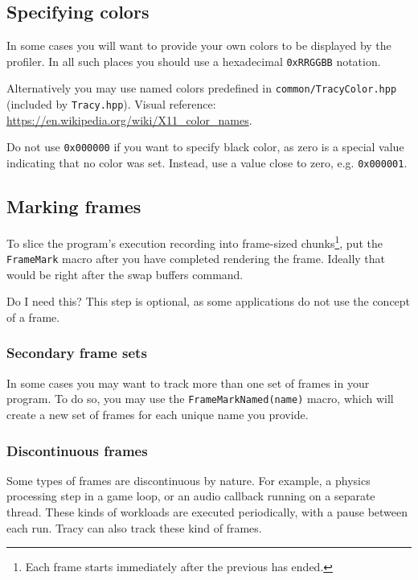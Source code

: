 \documentclass[hidelinks,titlepage,a4paper]{article}
\begin{document}
\subsection{Specifying colors}

In some cases you will want to provide your own colors to be displayed by the profiler. In all such places you should use a hexadecimal \texttt{0xRRGGBB} notation.

Alternatively you may use named colors predefined in \texttt{common/TracyColor.hpp} (included by \texttt{Tracy.hpp}). Visual reference: \url{https://en.wikipedia.org/wiki/X11_color_names}.

Do not use \texttt{0x000000} if you want to specify black color, as zero is a special value indicating that no color was set. Instead, use a value close to zero, e.g. \texttt{0x000001}.

\subsection{Marking frames}
\label{markingframes}

To slice the program's execution recording into frame-sized chunks\footnote{Each frame starts immediately after the previous has ended.}, put the \texttt{FrameMark} macro after you have completed rendering the frame. Ideally that would be right after the swap buffers command.

\begin{bclogo}[
noborder=true,
couleur=black!5,
logo=\bclampe
]{Do I need this?}
This step is optional, as some applications do not use the concept of a frame.
\end{bclogo}

\subsubsection{Secondary frame sets}
\label{secondaryframeset}

In some cases you may want to track more than one set of frames in your program. To do so, you may use the \texttt{FrameMarkNamed(name)} macro, which will create a new set of frames for each unique name you provide.

\subsubsection{Discontinuous frames}

Some types of frames are discontinuous by nature. For example, a physics processing step in a game loop, or an audio callback running on a separate thread. These kinds of workloads are executed periodically, with a pause between each run. Tracy can also track these kind of frames.
\end{document}
